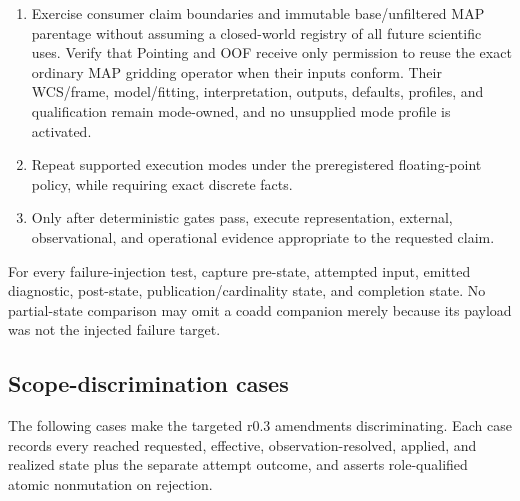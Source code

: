 \documentclass[10pt]{article}
\begin{document}
\begin{enumerate}
every block named by the selected covariance-qualified role before accepting the complete numerical propagation and
otherwise require partial, symbolic, summarized, lineage-resolvable, or
unavailable state on the base role. Verify no stronger role subsets an existing
base parent and verify versioned binding for later derivative products.
\item Exercise consumer claim boundaries and immutable base/unfiltered MAP
parentage without assuming a closed-world registry of all future scientific
uses.  Verify that Pointing and OOF receive only permission to reuse the exact
ordinary MAP gridding operator when their inputs conform.  Their WCS/frame,
model/fitting, interpretation, outputs, defaults, profiles, and qualification
remain mode-owned, and no unsupplied mode profile is activated.
\item Repeat supported execution modes under the preregistered floating-point
policy, while requiring exact discrete facts.
\item Only after deterministic gates pass, execute representation, external,
observational, and operational evidence appropriate to the requested claim.
\end{enumerate}

For every failure-injection test, capture pre-state, attempted input, emitted
diagnostic, post-state, publication/cardinality state, and completion state.
No partial-state comparison may omit a coadd companion merely because its
payload was not the injected failure target.

\subsection{Scope-discrimination cases}

The following cases make the targeted r0.3 amendments discriminating. Each
case records every reached requested, effective, observation-resolved, applied,
and realized state plus the separate attempt outcome, and asserts
role-qualified atomic nonmutation on rejection.

\SCIMapProductRoleDefinition

\SCIMapProductRoleDependencyTable
\end{document}
